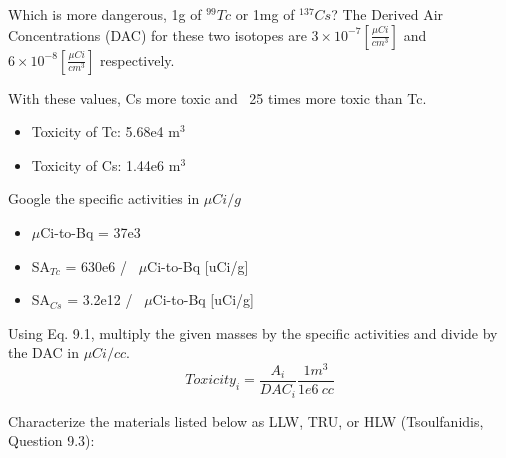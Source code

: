 \documentclass[11pt,answers,addpoints]{exam}
\begin{document}
\begin{questions}
	\question[15] Which is more dangerous, 1g of $^{99}Tc$ or 1mg of
	$^{137}Cs$? The Derived Air Concentrations (DAC) for these two isotopes
        are $3\times 10^{-7} \left[\frac{\mu Ci}{cm^3}\right]$ and 
        $6\times10^{-8} \left[\frac{\mu Ci}{cm^3}\right]$
        respectively.

        \begin{solution}
            With these values, Cs more toxic and ~25 times more toxic than Tc. 
            \begin{itemize}
                \item Toxicity of Tc: 5.68e4 m$^3$
                \item Toxicity of Cs: 1.44e6 m$^3$
            \end{itemize}

            Google the specific activities in $\mu Ci / g$
            \begin{itemize}
                \item $\mu$Ci-to-Bq = 37e3
                \item SA$_{Tc}$ = 630e6 / \ $\mu$Ci-to-Bq  [uCi/g]
                \item SA$_{Cs}$ = 3.2e12 / \ $\mu$Ci-to-Bq  [uCi/g]
            \end{itemize}

            Using Eq. 9.1, multiply the given masses by the specific activities and divide by the DAC in $\mu Ci/cc$.
            \begin{equation}
                Toxicity_i = \frac{A_i}{DAC_i} \frac{1 m^3}{1e6 \ cc}
            \end{equation}      
        \end{solution}

        \question Characterize the materials listed below as LLW, TRU, or HLW 
        (Tsoulfanidis, Question 9.3):


\end{questions}
\end{document}
